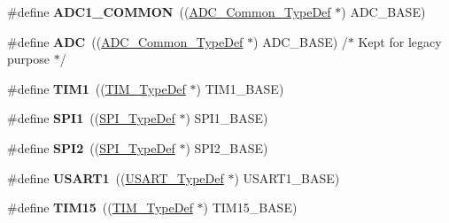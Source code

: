 \begin{DoxyCompactItemize}
\item 
\mbox{\label{group___peripheral__declaration_gaf1919c64fc774aab31190346fd5457e2}} 
\#define {\bfseries A\+D\+C1\+\_\+\+C\+O\+M\+M\+ON}~((\hyperlink{struct_a_d_c___common___type_def}{A\+D\+C\+\_\+\+Common\+\_\+\+Type\+Def} $\ast$) A\+D\+C\+\_\+\+B\+A\+SE)
\item 
\mbox{\label{group___peripheral__declaration_ga54d148b91f3d356713f7e367a2243bea}} 
\#define {\bfseries A\+DC}~((\hyperlink{struct_a_d_c___common___type_def}{A\+D\+C\+\_\+\+Common\+\_\+\+Type\+Def} $\ast$) A\+D\+C\+\_\+\+B\+A\+SE) /$\ast$ Kept for legacy purpose $\ast$/
\item 
\mbox{\label{group___peripheral__declaration_ga2e87451fea8dc9380056d3cfc5ed81fb}} 
\#define {\bfseries T\+I\+M1}~((\hyperlink{struct_t_i_m___type_def}{T\+I\+M\+\_\+\+Type\+Def} $\ast$) T\+I\+M1\+\_\+\+B\+A\+SE)
\item 
\mbox{\label{group___peripheral__declaration_gad483be344a28ac800be8f03654a9612f}} 
\#define {\bfseries S\+P\+I1}~((\hyperlink{struct_s_p_i___type_def}{S\+P\+I\+\_\+\+Type\+Def} $\ast$) S\+P\+I1\+\_\+\+B\+A\+SE)
\item 
\mbox{\label{group___peripheral__declaration_gaf2c3d8ce359dcfbb2261e07ed42af72b}} 
\#define {\bfseries S\+P\+I2}~((\hyperlink{struct_s_p_i___type_def}{S\+P\+I\+\_\+\+Type\+Def} $\ast$) S\+P\+I2\+\_\+\+B\+A\+SE)
\item 
\mbox{\label{group___peripheral__declaration_ga92871691058ff7ccffd7635930cb08da}} 
\#define {\bfseries U\+S\+A\+R\+T1}~((\hyperlink{struct_u_s_a_r_t___type_def}{U\+S\+A\+R\+T\+\_\+\+Type\+Def} $\ast$) U\+S\+A\+R\+T1\+\_\+\+B\+A\+SE)
\item 
\mbox{\label{group___peripheral__declaration_ga87e4b442041d1c03a6af113fbe04a182}} 
\#define {\bfseries T\+I\+M15}~((\hyperlink{struct_t_i_m___type_def}{T\+I\+M\+\_\+\+Type\+Def} $\ast$) T\+I\+M15\+\_\+\+B\+A\+SE)
\item 
\mbox{\label{group___peripheral__declaration_ga73ec606e7dacf17e18c661e8ff8c7c8d}} 

\end{DoxyCompactItemize}

